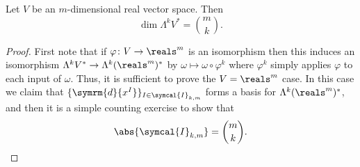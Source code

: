 \documentclass[fleqn]{NotesClass}
\renewcommand{\dl}{\symrm{d}}
\begin{document}
    \begin{lma}{}{}
        Let \(V\) be an \(m\)-dimensional real vector space.
        Then
        \begin{equation}
            \dim \Lambda^kV^* = \binom{m}{k}.
        \end{equation}
        \begin{proof}
            First note that if \(\varphi \colon V \to \reals^m\) is an isomorphism then this induces an isomorphism \(\Lambda^k V^* \to \Lambda^k (\reals^m)^*\) by \(\omega \mapsto \omega \circ \varphi^k\) where \(\varphi^k\) simply applies \(\varphi\) to each input of \(\omega\).
            Thus, it is sufficient to prove the \(V = \reals^m\) case.
            In this case we claim that \(\{\dl{x^I}\}_{I \in \symcal{I}_{k,m}}\) forms a basis for \(\Lambda^k(\reals^m)^*\), and then it is a simple counting exercise to show that
            \begin{equation}
                \abs{\symcal{I}_{k,m}} = \binom{m}{k}.
            \end{equation}
            

\end{proof}
\end{lma}
\end{document}

